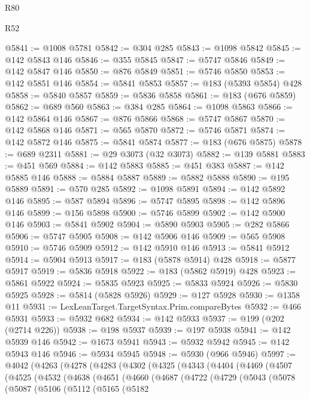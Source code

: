 \begin{lexlean}{R80}
\begin{lexlean}{R52}
\begin{coremodule}
{{{{{{{{{{{{{{{{{{{{{{{{{{{{{{{{{{{{{{{{{{{{{{{{{{{{{{{{{{{{{{{{{{{{{{{{{{{{{{{{{{{{{{{{{{{{{{{{{{{{{{{{{{{{{{{{{{{{{{{{{{{{{{{{{{{{{{{{{{{{{{{{{{{{{{{{{{{{{{{{{{{{{{{{{{{{{{{{{{{{{{{{{{{{{{{{{{{{{{@5841 := @1008 @5781
@5842 := @304 @285
@5843 := @1098 @5842
@5845 := @142 @5843 @146
@5846 := @355 @5845
@5847 := @5747 @5846
@5849 := @142 @5847 @146
@5850 := @876 @5849
@5851 := @5746 @5850
@5853 := @142 @5851 @146
@5854 := @5841 @5853
@5857 := @183 (@5393 @5854) @428
@5858 := @5840 @5857
@5859 := @5836 @5858
@5861 := @183 (@676 @5859)
@5862 := @689 @560
@5863 := @384 @285
@5864 := @1098 @5863
@5866 := @142 @5864 @146
@5867 := @876 @5866
@5868 := @5747 @5867
@5870 := @142 @5868 @146
@5871 := @565 @5870
@5872 := @5746 @5871
@5874 := @142 @5872 @146
@5875 := @5841 @5874
@5877 := @183 (@676 @5875)
@5878 := @689 @2311
@5881 := @29 @3073 (@32 @3073)
@5882 := @139 @5881
@5883 := @451 @569
@5884 := @142 @5883
@5885 := @451 @383
@5887 := @142 @5885 @146
@5888 := @5884 @5887
@5889 := @5882 @5888
@5890 := @195 @5889
@5891 := @570 @285
@5892 := @1098 @5891
@5894 := @142 @5892 @146
@5895 := @587 @5894
@5896 := @5747 @5895
@5898 := @142 @5896 @146
@5899 := @156 @5898
@5900 := @5746 @5899
@5902 := @142 @5900 @146
@5903 := @5841 @5902
@5904 := @5890 @5903
@5905 := @282 @5866
@5906 := @5747 @5905
@5908 := @142 @5906 @146
@5909 := @565 @5908
@5910 := @5746 @5909
@5912 := @142 @5910 @146
@5913 := @5841 @5912
@5914 := @5904 @5913
@5917 := @183 (@5878 @5914) @428
@5918 := @5877 @5917
@5919 := @5836 @5918
@5922 := @183 (@5862 @5919) @428
@5923 := @5861 @5922
@5924 := @5835 @5923
@5925 := @5833 @5924
@5926 := @5830 @5925
@5928 := @5814 (@5828 @5926)
@5929 := @127 @5928
@5930 := @1358 @11
@5931 := LexLeanTarget.TargetSyntax.Prim.compareBytes
@5932 := @466 @5931
@5933 := @5932 @682
@5934 := @142 @5933
@5937 := @199 (@202 (@2714 @226))
@5938 := @198 @5937
@5939 := @197 @5938
@5941 := @142 @5939 @146
@5942 := @1673 @5941
@5943 := @5932 @5942
@5945 := @142 @5943 @146
@5946 := @5934 @5945
@5948 := @5930 (@966 @5946)
@5997 := @4042
    (@4263
      (@4278
        (@4283
          (@4302
            (@4325
              (@4343
                (@4404
                  (@4469
                    (@4507
                      (@4525
                        (@4532
                          (@4638
                            (@4651
                              (@4660
                                (@4687
                                  (@4722
                                    (@4729
                                      (@5043
                                        (@5078
                                          (@5087
                                            (@5106
                                              (@5112
                                                (@5165
                                                  (@5182
}}}}}}}}}}}}}}}}}}}}}}}}}}}}}}}}}}}}}}}}}}}}}}}}}}}}}}}}}}}}}}}}}}}}}}}}}}}}}}}}}}}}}}}}}}}}}}}}}}}}}}}}}}}}}}}}}}}}}}}}}}}}}}}}}}}}}}}}}}}}}}}}}}}}}}}}}}}}}}}}}}}}}}}}}}}}}}}}}}}}}}}}}}}}}}}}}}}}}}
\end{coremodule}
\end{lexlean}
\end{lexlean}
